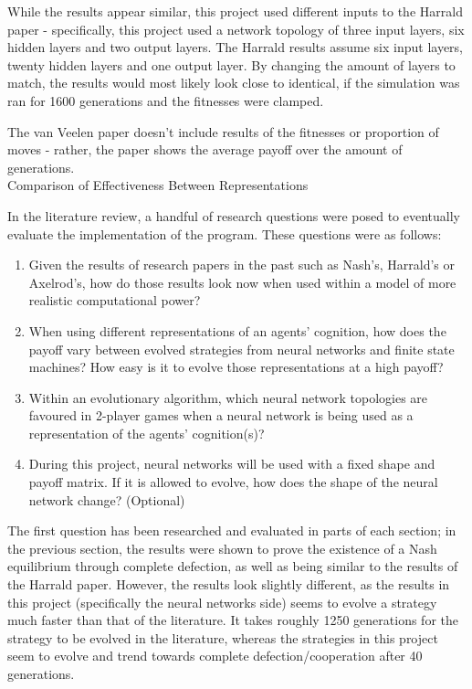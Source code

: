 \documentclass[12pt,a4paper]{article}
\makeatletter
\renewcommand\subsection{\@startsection {subsection}{1}{2mm}
                               {3pt plus 2pt minus 1pt}
                               {3pt plus 0pt}
                               {\normalfont\bfseries}}
\makeatother
\begin{document}
While the results appear similar, this project used different inputs to the Harrald paper - specifically, this project used a network topology of three input layers, six hidden layers and two output layers. The Harrald results assume six input layers, twenty hidden layers and one output layer. By changing the amount of layers to match, the results would most likely look close to identical, if the simulation was ran for 1600 generations and the fitnesses were clamped. 

The van Veelen paper\cite{46} doesn't include results of the fitnesses or proportion of moves - rather, the paper shows the average payoff over the amount of generations. \\

\subsection{Comparison of Effectiveness Between Representations}

In the literature review, a handful of research questions were posed to eventually evaluate the implementation of the program. These questions were as follows: \\

\begin{enumerate}
\item Given the results of research papers in the past such as Nash's, Harrald's or Axelrod's, how do those results look now when used within a model of more realistic computational power?
\item When using different representations of an agents' cognition, how does the payoff vary between evolved strategies from neural networks and finite state machines? How easy is it to evolve those representations at a high payoff?
\item Within an evolutionary algorithm, which neural network topologies are favoured in 2-player games when a neural network is being used as a representation of the agents' cognition(s)?
\item During this project, neural networks will be used with a fixed shape and payoff matrix. If it is allowed to evolve, how does the shape of the neural network change? (Optional) \\
\end{enumerate}

The first question has been researched and evaluated in parts of each section; in the previous section, the results were shown to prove the existence of a Nash equilibrium through complete defection, as well as being similar to the results of the Harrald paper. However, the results look slightly different, as the results in this project (specifically the neural networks side) seems to evolve a strategy much faster than that of the literature. It takes roughly 1250 generations for the strategy to be evolved in the literature, whereas the strategies in this project seem to evolve and trend towards complete defection/cooperation after 40 generations.
\end{document}
